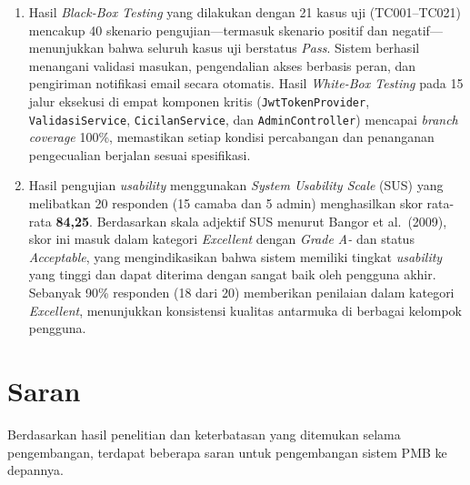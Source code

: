 \begin{enumerate}
	\item Hasil \textit{Black-Box Testing} yang dilakukan dengan 21 kasus uji (TC001--TC021) mencakup 40 skenario pengujian---termasuk skenario positif dan negatif---menunjukkan bahwa seluruh kasus uji berstatus \textit{Pass}. Sistem berhasil menangani validasi masukan, pengendalian akses berbasis peran, dan pengiriman notifikasi email secara otomatis. Hasil \textit{White-Box Testing} pada 15 jalur eksekusi di empat komponen kritis (\texttt{JwtTokenProvider}, \texttt{ValidasiService}, \texttt{CicilanService}, dan \texttt{AdminController}) mencapai \textit{branch coverage} 100\%, memastikan setiap kondisi percabangan dan penanganan pengecualian berjalan sesuai spesifikasi.
	
	\item Hasil pengujian \textit{usability} menggunakan \textit{System Usability Scale} (SUS) yang melibatkan 20 responden (15 camaba dan 5 admin) menghasilkan skor rata-rata \textbf{84{,}25}. Berdasarkan skala adjektif SUS menurut Bangor et al.\ (2009), skor ini masuk dalam kategori \textit{Excellent} dengan \textit{Grade A-} dan status \textit{Acceptable}, yang mengindikasikan bahwa sistem memiliki tingkat \textit{usability} yang tinggi dan dapat diterima dengan sangat baik oleh pengguna akhir. Sebanyak 90\% responden (18 dari 20) memberikan penilaian dalam kategori \textit{Excellent}, menunjukkan konsistensi kualitas antarmuka di berbagai kelompok pengguna.
\end{enumerate}

\section{Saran} \label{V.Saran}

Berdasarkan hasil penelitian dan keterbatasan yang ditemukan selama pengembangan, terdapat beberapa saran untuk pengembangan sistem PMB ke depannya.\par

